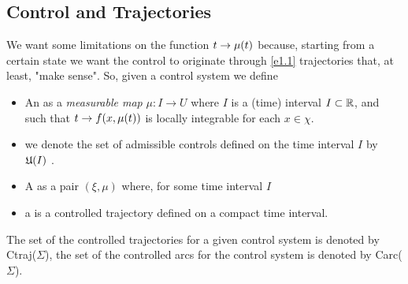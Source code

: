 \subsection{Control and Trajectories}
We want some limitations on the function $t\rightarrow\mu(t)$ because, starting from a certain state we want the control to originate through \eqref{e1.1} trajectories that, at least, "make sense". So, given a control system \controlSystemSpaced we define
\begin{itemize}
	\item An  as a \textit{measurable map} $\mu:I\rightarrow U$ where $I$ is a (time) interval $I\subset\mathbb{R}$, and such that $t\rightarrow f(x,\mu(t) )$ is locally integrable for each $x\in\chi$.
	\item we denote the set of admissible controls defined on the time interval $I$ by $\mathfrak{U}(I)$	.
	\item A  as a pair $(\xi,\mu)$ where, for some time interval $I$
	\item a  is a controlled trajectory defined on a compact time interval.
\end{itemize}
The set of the controlled trajectories for a given control system \controlSystemSpaced is denoted by Ctraj($\Sigma$), the set of the controlled arcs for the control system is denoted by Carc($\Sigma$).


